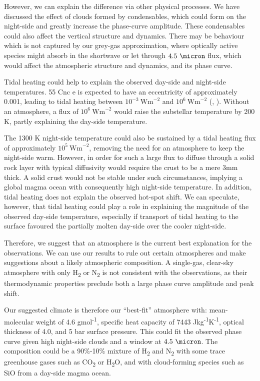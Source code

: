 However, we can explain the difference via other physical processes. We have discussed the effect of clouds formed by condensables, which could form on the night-side and greatly increase the phase-curve amplitude. These condensables could also affect the vertical structure and dynamics. There may be behaviour which is not captured by our grey-gas approximation, where optically active species might absorb in the shortwave or let through $4.5\ \micron$ flux, which would affect the atmospheric structure and dynamics, and its phase curve.

Tidal heating could help to explain the observed day-side and night-side temperatures. 55 Cnc e is expected to have an eccentricity of approximately 0.001, leading to tidal heating between $10^{-3}\ \mathrm{Wm}^{-2}$ and $10^{6}\ \mathrm{Wm}^{-2}$ (\citet{bolmont2013tidal}, \citet{demory2016map}). Without an atmosphere, a flux of $10^{6}\ \mathrm{Wm}^{-2}$ would raise the substellar temperature by 200 K, partly explaining the day-side temperature.

The 1300 K night-side temperature could also be sustained by a tidal heating flux of approximately $10^{5}\ \mathrm{Wm}^{-2}$, removing the need for an atmosphere to keep the night-side warm. However, in order for such a large flux to diffuse through a solid rock layer with typical diffusivity would require the crust to be a mere 3mm thick. A solid crust would not be stable under such circumstances, implying a global magma ocean with consequently high night-side temperature. In addition, tidal heating does not explain the observed hot-spot shift. We can speculate, however, that tidal heating could play a role in explaining the magnitude of the observed day-side temperature, especially if transport of tidal heating to the surface favoured the partially molten day-side over the cooler night-side.

Therefore, we suggest that an atmosphere is the current best explanation for the observations. We can use our results to rule out certain atmospheres and make suggestions about a likely atmospheric composition. A single-gas, clear-sky atmosphere with only H\textsubscript{2} or N\textsubscript{2} is not consistent with the observations, as their thermodynamic properties preclude both a large phase curve amplitude and peak shift.

Our suggested climate is therefore our ``best-fit'' atmosphere with: mean-molecular weight of 4.6 gmol\textsuperscript{-1}, specific heat capacity of 7443 Jkg\textsuperscript{-1}K\textsuperscript{-1}, optical thickness of 4.0, and 5 bar surface pressure. This could fit the observed phase curve given high night-side clouds and a window at $4.5\ \micron$. The composition could be a 90\%-10\% mixture of H\textsubscript{2} and N\textsubscript{2} with some trace greenhouse gases such as CO\textsubscript{2} or H\textsubscript{2}O, and with cloud-forming species such as SiO from a day-side magma ocean.

